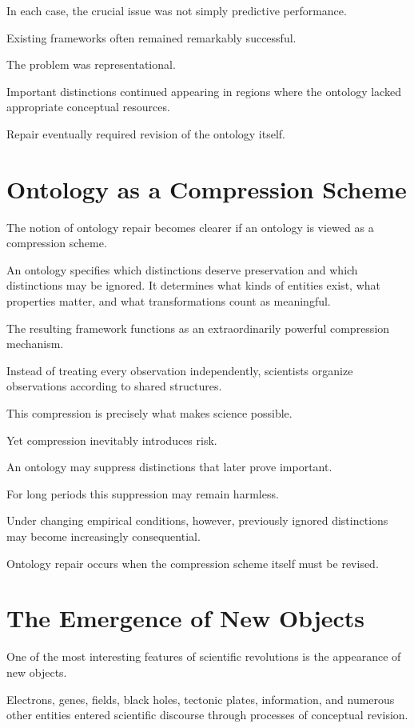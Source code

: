 \documentclass[11pt,oneside,openany]{book}
\begin{document}
In each case, the crucial issue was not simply predictive performance.

Existing frameworks often remained remarkably successful.

The problem was representational.

Important distinctions continued appearing in regions where the ontology lacked appropriate conceptual resources.

Repair eventually required revision of the ontology itself.

\section{Ontology as a Compression Scheme}

The notion of ontology repair becomes clearer if an ontology is viewed as a compression scheme.

An ontology specifies which distinctions deserve preservation and which distinctions may be ignored. It determines what kinds of entities exist, what properties matter, and what transformations count as meaningful.

The resulting framework functions as an extraordinarily powerful compression mechanism.

Instead of treating every observation independently, scientists organize observations according to shared structures.

This compression is precisely what makes science possible.

Yet compression inevitably introduces risk.

An ontology may suppress distinctions that later prove important.

For long periods this suppression may remain harmless.

Under changing empirical conditions, however, previously ignored distinctions may become increasingly consequential.

Ontology repair occurs when the compression scheme itself must be revised.

\section{The Emergence of New Objects}

One of the most interesting features of scientific revolutions is the appearance of new objects.

Electrons, genes, fields, black holes, tectonic plates, information, and numerous other entities entered scientific discourse through processes of conceptual revision.
\end{document}

